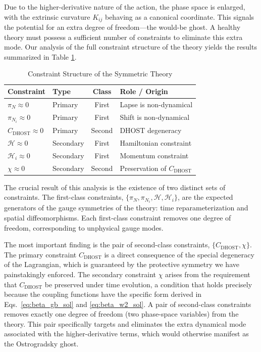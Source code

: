 \documentclass[twocolumn]{aastex631}
\begin{document}
Due to the higher-derivative nature of the action, the phase space is enlarged, with the extrinsic curvature $K_{ij}$ behaving as a canonical coordinate. This signals the potential for an extra degree of freedom---the would-be ghost. A healthy theory must possess a sufficient number of constraints to eliminate this extra mode. Our analysis of the full constraint structure of the theory yields the results summarized in Table \ref{tab:constraints}.

\begin{table}[h]
    \centering
    \caption{Constraint Structure of the Symmetric Theory}
    \label{tab:constraints}
    \begin{tabular}{llcl}
        \hline \hline
        Constraint & Type & Class & Role / Origin \\
        \hline
        $\pi_N \approx 0$ & Primary & First & Lapse is non-dynamical \\
        $\pi_{N_i} \approx 0$ & Primary & First & Shift is non-dynamical \\
        $C_{\text{DHOST}} \approx 0$ & Primary & Second & DHOST degeneracy \\
        $\mathcal{H} \approx 0$ & Secondary & First & Hamiltonian constraint \\
        $\mathcal{H}_i \approx 0$ & Secondary & First & Momentum constraint \\
        $\chi \approx 0$ & Secondary & Second & Preservation of $C_{\text{DHOST}}$ \\
        \hline
    \end{tabular}
\end{table}

The crucial result of this analysis is the existence of two distinct sets of constraints. The first-class constraints, $\{\pi_N, \pi_{N_i}, \mathcal{H}, \mathcal{H}_i\}$, are the expected generators of the gauge symmetries of the theory: time reparameterization and spatial diffeomorphisms. Each first-class constraint removes one degree of freedom, corresponding to unphysical gauge modes.

The most important finding is the pair of second-class constraints, $\{C_{\text{DHOST}}, \chi\}$. The primary constraint $C_{\text{DHOST}}$ is a direct consequence of the special degeneracy of the Lagrangian, which is guaranteed by the protective symmetry we have painstakingly enforced. The secondary constraint $\chi$ arises from the requirement that $C_{\text{DHOST}}$ be preserved under time evolution, a condition that holds precisely because the coupling functions have the specific form derived in Eqs.~\eqref{eq:beta_gb_sol} and \eqref{eq:beta_w2_sol}. A pair of second-class constraints removes exactly one degree of freedom (two phase-space variables) from the theory. This pair specifically targets and eliminates the extra dynamical mode associated with the higher-derivative terms, which would otherwise manifest as the Ostrogradsky ghost.
\end{document}
